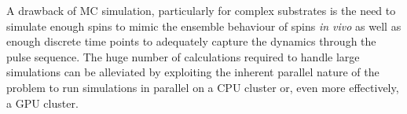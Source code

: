 A drawback of \ac{MC} simulation, particularly for complex substrates is the need to simulate enough spins to mimic the ensemble behaviour of spins \emph{in vivo} as well as enough discrete time points to adequately capture the dynamics through the pulse sequence.
The huge number of calculations required to handle large simulations can be alleviated by exploiting the inherent parallel nature of the problem to run simulations in parallel on a \ac{CPU} cluster or, even more effectively, a \ac{GPU} cluster.




